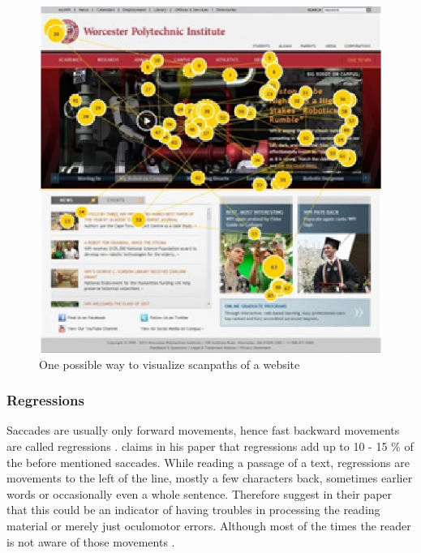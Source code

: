 \begin{figure}[!ht]
    \centering
    \includegraphics[width=0.75\linewidth]{images/scanpath_djamasbi2014eye.png}
    \caption{
       One possible way to visualize scanpaths of a website \autocite[43]{djamasbi2014eye}
    }
    \label{figure:Scanpath}
\end{figure}

\subsubsection{Regressions}
Saccades are usually only forward movements, hence fast backward movements are called regressions \autocite[]{reichle1998toward}. 
\textcite[]{rayner1998eye} claims in his paper that regressions add up to 10 - 15 \% of the before mentioned saccades.
While reading a passage of a text, regressions are movements to the left of the line, mostly a few characters back, sometimes earlier words or occasionally even a whole sentence. Therefore \textcite[]{kruger2014subtitles} suggest in their paper that this could be an indicator of having troubles in processing the reading material or merely just oculomotor errors. Although most of the times the reader is not aware of those movements \autocite[]{reichle2003ez, biedert2010eyebook}.

